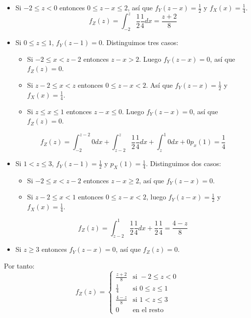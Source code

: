 \begin{example}
\begin{itemize}
        \item Si $-2 \leq z < 0$ entonces $0 \leq z-x \leq 2$, así que $f_Y(z-x) = \frac{1}{2}$ y $f_X(x) = \frac{1}{4}$.
              $$f_Z(z) = \int_{-2}^z \frac{1}{2} \frac{1}{4} dx = \frac{z+2}{8}$$
        \item Si $0 \leq z \leq 1$, $f_Y(z-1) = 0$.
              Distinguimos tres casos:
              \begin{itemize}
                  \item Si $-2 \leq x < z-2$ entonces $z-x > 2$.
                        Luego $f_Y(z-x) = 0$, así que $f_Z(z) = 0$.
                  \item Si $z-2 \leq x < z$ entonces $0 \leq z-x < 2$.
                        Así que $f_Y(z-x) = \frac{1}{2}$ y $f_X(x) = \frac{1}{4}$.
                  \item Si $z \leq x \leq 1$ entonces $z-x \leq 0$.
                        Luego $f_Y(z-x) = 0$, así que $f_Z(z) = 0$.
              \end{itemize}
              $$f_Z(z) = \int_{-2}^{z-2} 0 dx + \int_{z-2}^z \frac{1}{2} \frac{1}{4} dx + \int_z^1 0 dx + 0p_x(1) = \frac{1}{4}$$
        \item Si $1 < z \leq 3$, $f_Y(z-1) = \frac{1}{2}$ y $p_X(1) = \frac{1}{4}$.
              Distinguimos dos casos:
              \begin{itemize}
                  \item Si $-2 \leq x < z-2$ entonces $z-x \geq 2$, así que $f_Y(z-x) = 0$.
                  \item Si $z-2 \leq x < 1$ entonces $0 \leq z-x < 2$, luego $f_Y(z-x) = \frac{1}{2}$ y $f_X(x) = \frac{1}{4}$.
              \end{itemize}
              $$f_Z(z) = \int_{z-2}^1 \frac{1}{2} \frac{1}{4} dx + \frac{1}{2} \frac{1}{4} = \frac{4-z}{8}$$
        \item Si $z \geq 3$ entonces $f_Y(z-x) = 0$, así que $f_Z(z) = 0$.
    \end{itemize}
    Por tanto:
    $$f_Z(z) = \begin{cases}
            \frac{z+2}{8} & \text{si } -2 \leq z < 0   \\
            \frac{1}{4}   & \text{si } 0 \leq z \leq 1 \\
            \frac{4-z}{8} & \text{si } 1 < z \leq 3    \\
            0             & \text{en el resto}
        \end{cases}$$
\end{example}

